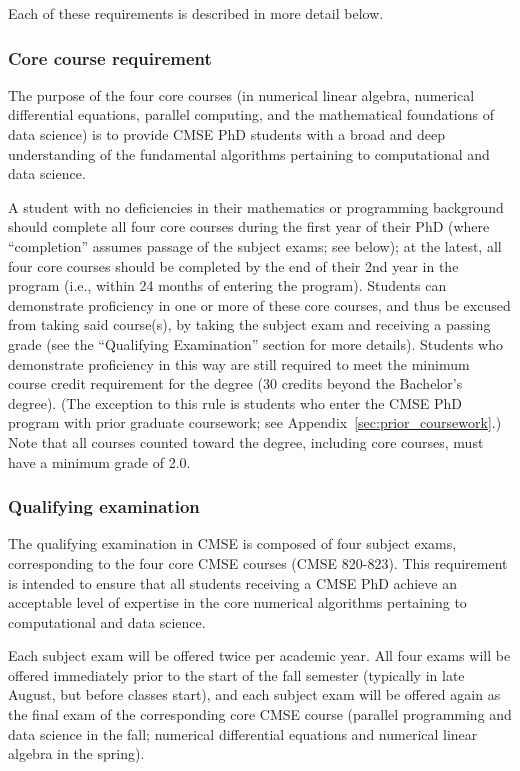 Each of these requirements is described in more detail below.

\vspace{3mm}
\subsubsection{Core course requirement}
\label{sec:core_courses}

The purpose of the four core courses (in numerical linear algebra,
numerical differential equations, parallel computing, and the
mathematical foundations of data science) is to provide CMSE PhD
students with a broad and deep understanding of the fundamental
algorithms pertaining to computational and data science.

A student with no deficiencies in their mathematics or programming
background should complete all four core courses during the first year
of their PhD (where ``completion'' assumes passage of the subject exams;
see below); at the latest, all four core courses should be completed
by the end of their 2nd year in the program (i.e., within 24 months of
entering the program).  Students can demonstrate proficiency in
one or more of these core courses, and thus be excused from taking
said course(s), by taking the subject exam and receiving a passing
grade (see the ``Qualifying Examination'' section for more details).
Students who demonstrate proficiency in this way are still required to
meet the minimum course credit requirement for the degree (30 credits
beyond the Bachelor's degree).  (The exception to this rule is
students who enter the CMSE PhD program with prior graduate
coursework; see Appendix~\ref{sec:prior_coursework}.)  Note that all courses
counted toward the degree, including core courses, must
have a minimum grade of 2.0.

\vspace{3mm}
\subsubsection{Qualifying examination}
\label{sec:qual_exam}

The qualifying examination in CMSE is composed of four subject exams,
corresponding to the four core CMSE courses (CMSE 820-823). This
requirement is intended to ensure that all students receiving a CMSE
PhD achieve an acceptable level of expertise in the core numerical
algorithms pertaining to computational and data science.  

Each subject exam will be offered twice per academic year.  All four
exams will be offered immediately prior to the start of the fall
semester (typically in late August, but before classes start), 
and each subject exam will be offered again as the final
exam of the corresponding core CMSE course (parallel programming and
data science in the fall; numerical differential equations
and numerical linear algebra in the spring).

